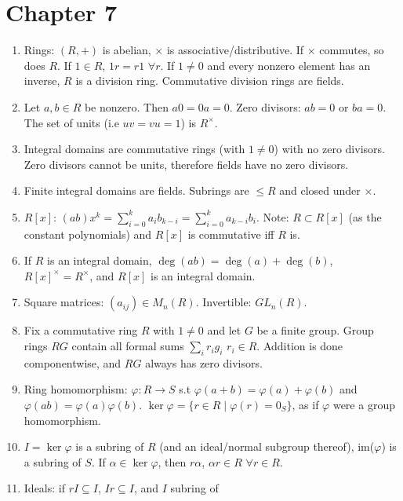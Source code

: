 \documentclass{article}
\begin{document}
\section*{Chapter 7}

\begin{enumerate}[1.]
    \item Rings: $(R, +)$ is abelian, $\times$ is associative/distributive.
        If $\times$ commutes, so does $R$. If $1 \in R$, $1r = r1$ $\forall
        r$. If $1 \not= 0$ and every nonzero element has an inverse, $R$ is
        a division ring. Commutative division rings are fields.
    \item Let $a,b \in R$ be nonzero. Then $a0 = 0a = 0$. Zero divisors:
        $ab = 0$ or $ba = 0$. The set of units (i.e $uv = vu = 1$) is
        $R^{\times}$.
    \item Integral domains are commutative rings (with $1 \not= 0$)
        with no zero divisors. Zero divisors cannot be units, therefore
        fields have no zero divisors.
    \item Finite integral domains are fields. Subrings are $\leq R$ and
        closed under $\times$.
    \item $R[x]$: $(ab)x^k = \sum_{i=0}^k a_ib_{k-i} =
        \sum_{i=0}^k a_{k-i}b_i$. Note: $R \subset R[x]$ (as the constant
        polynomials) and $R[x]$ is commutative iff $R$ is.
    \item If $R$ is an integral domain, $\deg(ab) = \deg(a) + \deg(b)$,
        $R[x]^{\times} = R^{\times}$, and $R[x]$ is an integral domain.
    \item Square matrices: $(a_{ij}) \in M_n(R)$. Invertible: $GL_n(R)$.
    \item Fix a commutative ring $R$ with $1 \not= 0$ and let
        $G$ be a finite group. Group rings $RG$ contain all formal sums
        $\sum_i r_ig_i$ $r_i \in R$. Addition is done componentwise, and
        $RG$ always has zero divisors.
    \item Ring homomorphism: $\varphi : R \rightarrow S$ s.t $\varphi(a + b) =
        \varphi(a) + \varphi(b)$ and $\varphi(ab) = \varphi(a)\varphi(b)$.
        $\ker \varphi = \{r \in R \mid \varphi(r) = 0_S\}$, as if $\varphi$
        were a group homomorphism.
    \item $I = \ker \varphi$ is a subring of $R$ (and an ideal/normal subgroup
        thereof), im($\varphi$) is a subring of $S$.
        If $\alpha \in \ker \varphi$, then $r\alpha$, $\alpha r \in R$
        $\forall r \in R$.
    \item Ideals: if $rI \subseteq I$, $Ir \subseteq I$, and $I$ subring of

\end{enumerate}
\end{document}
